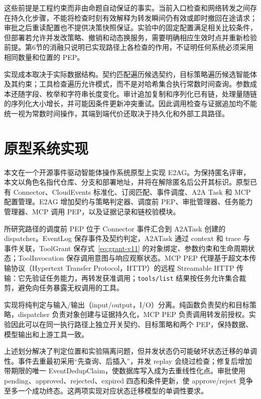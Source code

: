 这些前提是工程约束而非由命题自动保证的事实。当前入口检查和网络转发之间存在持久化步骤，不能将检查时刻有效解释为转发瞬间仍有效或即时撤回在途请求；审批之后重读配置也不提供决策快照保证。实验中的固定配置满足相关比较条件，但部署若允许并发改策略、撤销和动态换服务，需要明确相应生效时点并重新检验前提。第6节的消融只说明已实现路径上各检查的作用，不证明任何系统必须采用相同数量和位置的 PEP。

实现成本取决于实际数据结构。契约匹配遍历候选契约，目标策略遍历候选智能体及其约束；工具检查遍历允许模式，而不是对哈希集合执行常数时间查询。参数成本还随字段、枚举和字符串长度变化。审计追加复制和序列化已有链，处理量随链的序列化大小增长，并可能因条件更新冲突重试。因此调用检查与证据追加均不能统一视为常数时间操作，其端到端代价还取决于持久化和外部工具路径。

\section{原型系统实现}\label{sec:implementation-v11}

本文在一个开源事件驱动智能体操作系统原型上实现 E2AG。为保持匿名评审，本文以角色名指代仓库、分支和部署地址，并将在解除匿名后公开其标识。原型已有 Connector、CloudEvents 标准化、订阅匹配、事件调度、A2A Task 和 MCP 配置管理。E2AG 增加契约与策略判定器、调度前 PEP、审批管理器、任务能力管理器、MCP 调用 PEP，以及证据记录和链校验模块。

所研究路径的调度前 PEP 位于 Connector 事件汇合到 A2ATask 创建的 dispatcher。EventLog 保存事件及契约判定，A2ATask 通过 context 和 trace 与事件关联，ToolGrant 保存式~\eqref{eq:grant-v11} 的对象绑定、参数约束和生命周期状态；ToolInvocation 保存调用意图与响应观察状态。MCP PEP 代理基于超文本传输协议（Hypertext Transfer Protocol，HTTP）的远程 Streamable HTTP 传输：它先验证任务能力，再转发获准调用；\texttt{tools/list} 结果按任务允许集合裁剪，避免向任务暴露无权调用的工具。

实现将纯判定与输入/输出（input/output，I/O）分离。纯函数负责契约和目标策略，dispatcher 负责对象创建与证据持久化，MCP PEP 负责调用转发前授权。实验因此可以在同一执行路径上独立开关契约、目标策略和两个 PEP，保持数据、模型输出和上游工具一致。

上述划分解决了判定位置和实验隔离问题，但并发状态仍可能破坏状态迁移的单调性。事件去重最初采用“先查询、后插入”，并发 replay 会绕过检查；修复后增加带期限的唯一 EventDedupClaim，使数据库写入成为去重线性化点。审批使用 pending、approved、rejected、expired 四态和条件更新，使 approve/reject 竞争至多一个成功终态。这两项实现对应状态迁移模型的单调性要求。


